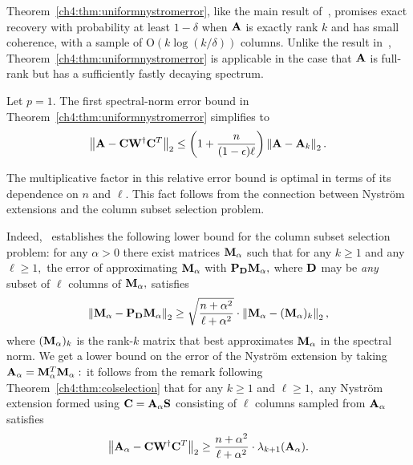 \begin{remark}
Theorem~\ref{ch4:thm:uniformnystromerror}, like the main result of~\cite{RT10},
promises exact recovery with probability at least $1-\delta$ when $\mathbf{A}$ is
exactly rank $k$ and has small coherence, with a sample of $\mathrm{O}(k \log
(k/\delta))$ columns. Unlike the result in~\cite{RT10}, Theorem~\ref{ch4:thm:uniformnystromerror} 
is applicable in the case that $\mathbf{A}$ is
full-rank but has a sufficiently fastly decaying spectrum.
\end{remark}

\begin{remark}
Let $p=1.$ The first spectral-norm error bound in Theorem~\ref{ch4:thm:uniformnystromerror}
simplifies to 
\[
 \left\|\mathbf{A} - \mathbf{C}\mathbf{W}^\dagger \mathbf{C}^T\right\|_2 \leq 
 \left(1 + \frac{n}{(1-\epsilon)\ell} \right) \left\|\mathbf{A} - \mathbf{A}_k\right\|_2.
\]

The multiplicative factor in this relative error bound 
is optimal in terms of its dependence on
$n$ and $\ell.$ This fact follows from the connection between Nystr\"om
extensions and the column subset selection problem. 
 
 Indeed,~\cite{BDM11a} establishes the following lower bound for the column
subset selection problem:
 for any $\alpha >0$ there exist matrices $\mathbf{M}_\alpha$ such that for any $k \geq
1$ and any $\ell \geq 1,$ the error of approximating $\mathbf{M}_\alpha$ with
$\mathbf{P}_{\mathbf{D}}\mathbf{M}_\alpha,$ where $\mathbf{D}$ may be \emph{any} subset of
$\ell$ columns of $\mathbf{M}_\alpha,$ satisfies
 \[
  \left\|\mathbf{M}_\alpha - \mathbf{P}_{\mathbf{D}}\mathbf{M}_\alpha\right\|_2 \geq \sqrt{\frac{n +
\alpha^2}{\ell + \alpha^2}} \cdot \left\|\mathbf{M}_\alpha - (\mathbf{M}_\alpha)_k\right\|_2,
 \]
 where $(\mathbf{M}_\alpha)_k$ is the rank-$k$ matrix that best approximates
$\mathbf{M}_\alpha$ in the spectral norm. We get a lower bound on the error of the
Nystr\"om extension by taking $\mathbf{A}_\alpha = \mathbf{M}_\alpha^T
\mathbf{M}_\alpha:$ it follows from the remark following
Theorem~\ref{ch4:thm:colselection} that for any $k \geq 1$ and $\ell \geq 1,$ any
Nystr\"om extension formed using $\mathbf{C} = \mathbf{A}_\alpha \mathbf{S}$ consisting
of $\ell$ columns sampled from $\mathbf{A}_\alpha$ satisfies
 \[
  \left\|\mathbf{A}_\alpha - \mathbf{C}\mathbf{W}^\dagger\mathbf{C}^T\right\|_2 \geq \frac{n +
\alpha^2}{\ell + \alpha^2} \cdot \lambda_{k+1}(\mathbf{A}_\alpha).
 \]
\end{remark}

